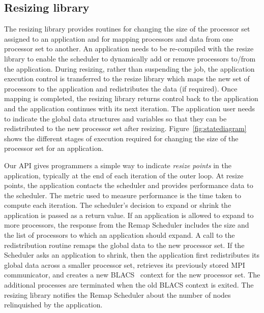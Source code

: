 \documentclass[letterpaper]{llncs}
\begin{document}
\subsection{Resizing library}
The resizing library provides routines for changing the size of the processor set assigned to an application and for mapping processors and data from one processor set to another. An application needs to be  re-compiled with the resize library to enable the scheduler to dynamically add or remove processors to/from the application. During resizing, rather than suspending the job, the application execution control is transferred to the resize library which maps the new set of processors to the application and  redistributes the data (if required). Once mapping is completed, the resizing library returns control back to the application and the application continues with its next iteration. The application user needs to indicate the global data structures and variables so that they can be redistributed to the new processor set after resizing. Figure~\ref{fig:statediagram}{} shows the different stages of execution required for changing the size of the processor set for an application.

Our API gives programmers a simple way to indicate \textit{resize points} in the application, typically at the end of each iteration of the outer loop. At resize points, the application contacts the scheduler and provides performance data to the scheduler.  The metric used to measure performance is the time taken to compute each iteration. The scheduler's decision to expand or shrink the application is passed as a return value.
If an application is allowed to expand to more processors, the response from the Remap Scheduler includes the size and the list of processors to which an application should expand.
A call to the redistribution routine remaps the global data to the new processor set. If the Scheduler asks an application to shrink, then the  application first redistributes its global data across a smaller processor set, retrieves its previously stored MPI communicator,  and creates a new BLACS~\cite{dongarra} context for the new processor set. The additional processes are terminated when the old BLACS context is exited.  The resizing library notifies the Remap Scheduler about the number of nodes relinquished by the application.
\end{document}
